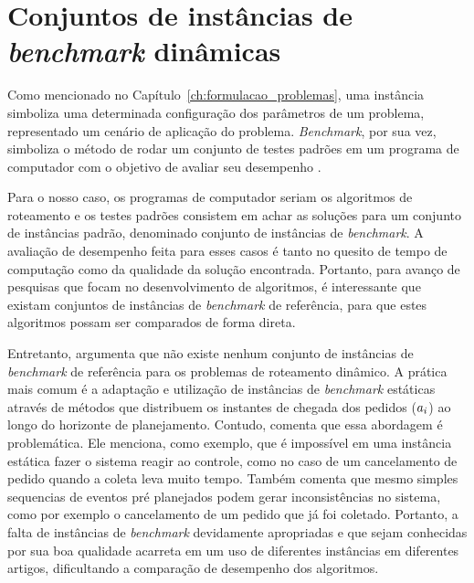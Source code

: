 \chapter{Conjuntos de instâncias de \textit{benchmark} dinâmicas}
\label{ch:instancias}
Como mencionado no Capítulo~\ref{ch:formulacao_problemas}, uma instância
simboliza uma determinada configuração dos parâmetros de um problema,
representado um cenário de aplicação do problema.
\textit{Benchmark}, por sua vez, simboliza o método de rodar um conjunto de
testes padrões em um programa de computador com o objetivo de avaliar seu
desempenho \cite{fleming_how_1986}.

Para o nosso caso, os programas de computador seriam os algoritmos de
roteamento e os testes padrões consistem em achar as soluções para um conjunto 
de instâncias padrão, denominado conjunto de instâncias de \textit{benchmark}.
A avaliação de desempenho feita para esses casos é tanto no quesito de tempo
de computação como da qualidade da solução encontrada.
Portanto, para avanço de pesquisas que focam no desenvolvimento de algoritmos,
é interessante que existam conjuntos de instâncias de
\textit{benchmark} de referência, para que estes algoritmos possam ser
comparados de forma direta.

Entretanto, \textcite{pillac_review_2013} argumenta que não existe nenhum
conjunto de instâncias de \textit{benchmark} de referência para os problemas 
de roteamento dinâmico.
A prática mais comum é a adaptação e utilização de instâncias de 
\textit{benchmark} estáticas através de métodos que distribuem os instantes de 
chegada dos pedidos ($a_i$) ao longo do horizonte de
planejamento.
Contudo, \textcite{maciejewski_towards_2017} comenta que essa abordagem é 
problemática.
Ele menciona, como exemplo, que é impossível em uma instância estática fazer o 
sistema reagir ao controle, como no caso de um cancelamento de pedido quando a
coleta leva muito tempo. 
Também comenta que mesmo simples sequencias de eventos pré planejados podem
gerar inconsistências no sistema, como por exemplo o cancelamento de um pedido
que já foi coletado.
Portanto, a falta de instâncias de \textit{benchmark} devidamente apropriadas e
que sejam conhecidas por sua boa qualidade acarreta em um uso de diferentes 
instâncias em diferentes artigos, dificultando a comparação de desempenho dos 
algoritmos.


